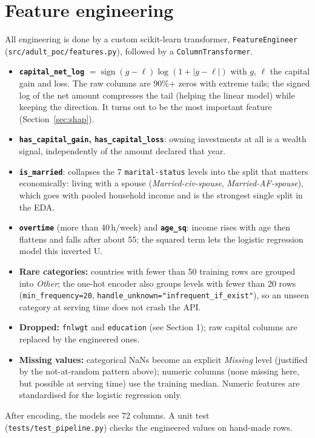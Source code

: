 \documentclass[10.5pt,a4paper]{article}
\newcommand{\code}[1]{\texttt{\small #1}}
\begin{document}
\section{Feature engineering}
All engineering is done by a custom scikit-learn transformer, \code{FeatureEngineer}
(\code{src/adult\_poc/features.py}), followed by a \code{ColumnTransformer}.
\begin{itemize}
  \item \textbf{\code{capital\_net\_log}} $=\operatorname{sign}(g-\ell)\log(1+|g-\ell|)$ with $g$, $\ell$ the
  capital gain and loss. The raw columns are 90\%+ zeros with extreme tails; the signed log of the net
  amount compresses the tail (helping the linear model) while keeping the direction. It turns out to be the
  most important feature (Section~\ref{sec:shap}).
  \item \textbf{\code{has\_capital\_gain}, \code{has\_capital\_loss}}: owning investments at all is a wealth
  signal, independently of the amount declared that year.
  \item \textbf{\code{is\_married}}: collapses the 7 \code{marital-status} levels into the split that
  matters economically: living with a spouse (\textit{Married-civ-spouse}, \textit{Married-AF-spouse}), which
  goes with pooled household income and is the strongest single split in the EDA.
  \item \textbf{\code{overtime}} (more than 40\,h/week) and \textbf{\code{age\_sq}}: income rises with age then
  flattens and falls after about 55; the squared term lets the logistic regression model this inverted U.
  \item \textbf{Rare categories:} countries with fewer than 50 training rows are grouped into \textit{Other};
  the one-hot encoder also groups levels with fewer than 20 rows (\code{min\_frequency=20},
  \code{handle\_unknown="infrequent\_if\_exist"}), so an unseen category at serving time does not crash the API.
  \item \textbf{Dropped:} \code{fnlwgt} and \code{education} (see Section 1); raw capital columns are
  replaced by the engineered ones.
  \item \textbf{Missing values:} categorical NaNs become an explicit \textit{Missing} level (justified by the
  not-at-random pattern above); numeric columns (none missing here, but possible at serving time) use the
  training median. Numeric features are standardised for the logistic regression only.
\end{itemize}
After encoding, the models see 72 columns. A unit test (\code{tests/test\_pipeline.py}) checks the
engineered values on hand-made rows.
\end{document}
